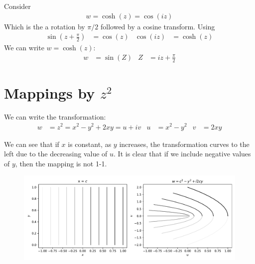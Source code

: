 \documentclass[12pt, english]{book}
\begin{document}
	\begin{example}
		Consider
		\begin{align*}
			w = \cosh(z) = \cos(iz)
		\end{align*}
		Which is the a rotation by \(\pi /2 \) followed by a cosine transform.
		Using
		\begin{align*}
			\sin(z + \frac{\pi}{2}) &= \cos(z) & \cos(iz) &= \cosh(z)
		\end{align*}
		We can write \(w = \cosh(z)\):
		\begin{align*}
			w &= \sin(Z) & Z &= iz + \frac{\pi}{2}
		\end{align*}
	\end{example}
	
	\section{Mappings by \texorpdfstring{\(z^2\)}{TEXT}} \label{Mappings by z^2 Section - Complex}
	
	
	We can write the transformation:
	\begin{align*}
		w &= z^2 = x^2 - y^2 + 2xy = u + iv &
		u &= x^2 - y^2 & 
		v &= 2xy
	\end{align*}

	We can see that if \(x\) is constant, as \(y\) increases, the transformation curves to the left due to the decreasing value of \(u\). It is clear that if we include negative values of \(y\), then the mapping is not 1-1.
	\begin{figure}[H]
		\centering
		\includegraphics[width=0.9\linewidth]{Python/Mapping_by_z_Squared_V}
		\caption*{}
		\label{fig:mappingbyzsquaredv}
	\end{figure}
	
\end{document}
